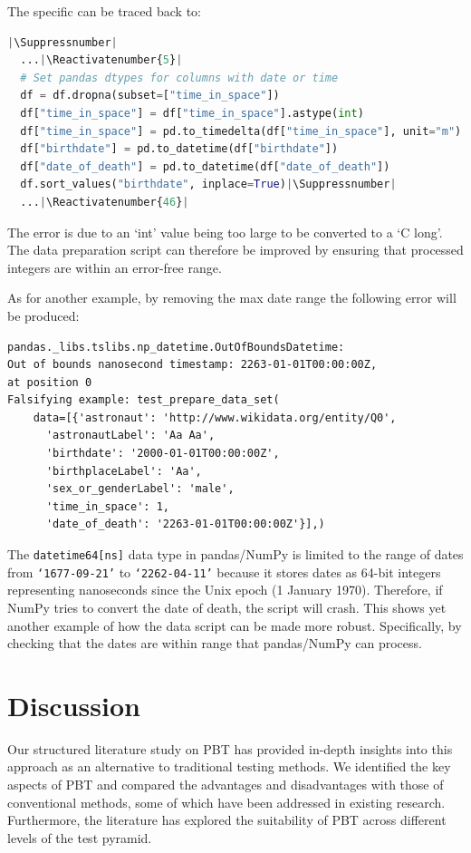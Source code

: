 \documentclass[runningheads]{llncs}
\makeatletter
\let\origthelstnumber\thelstnumber
\newcommand*\Suppressnumber{%
  \lst@AddToHook{OnNewLine}{%
    \let\thelstnumber\relax%
     \advance\c@lstnumber-\@ne\relax%
    }%
}
\newcommand*\Reactivatenumber[1]{%
  \setcounter{lstnumber}{\numexpr#1-1\relax}
  \lst@AddToHook{OnNewLine}{%
   \let\thelstnumber\origthelstnumber%
   \refstepcounter{lstnumber}%
  }%
}
\makeatother
\begin{document}
\noindent The specific can be traced back to:

\begin{lstlisting}[language=Python,caption={Prepare Data Set from code/data\_analysis.ipynb}]
  |\Suppressnumber|
  ...|\Reactivatenumber{5}|
  # Set pandas dtypes for columns with date or time
  df = df.dropna(subset=["time_in_space"])
  df["time_in_space"] = df["time_in_space"].astype(int)
  df["time_in_space"] = pd.to_timedelta(df["time_in_space"], unit="m")
  df["birthdate"] = pd.to_datetime(df["birthdate"])
  df["date_of_death"] = pd.to_datetime(df["date_of_death"])
  df.sort_values("birthdate", inplace=True)|\Suppressnumber|
  ...|\Reactivatenumber{46}|

\end{lstlisting}
The error is due to an `int' value being too large to be converted to a `C long'. The data preparation script can therefore be improved by ensuring that processed integers are within an error-free range.

\vspace{5mm}
\noindent As for another example, by removing the max date range the following error will be produced:

\begin{verbatim}
pandas._libs.tslibs.np_datetime.OutOfBoundsDatetime: 
Out of bounds nanosecond timestamp: 2263-01-01T00:00:00Z, 
at position 0
Falsifying example: test_prepare_data_set(
    data=[{'astronaut': 'http://www.wikidata.org/entity/Q0',
      'astronautLabel': 'Aa Aa',
      'birthdate': '2000-01-01T00:00:00Z',
      'birthplaceLabel': 'Aa',
      'sex_or_genderLabel': 'male',
      'time_in_space': 1,
      'date_of_death': '2263-01-01T00:00:00Z'}],) 
\end{verbatim}

\vspace{5mm}
\noindent The \texttt{datetime64[ns]} data type in pandas/NumPy is limited to the range of dates from \texttt{`1677-09-21'} to \texttt{`2262-04-11'} because it stores dates as 64-bit integers representing nanoseconds since the Unix epoch (1 January 1970). Therefore, if NumPy tries to convert the date of death, the script will crash. This shows yet another example of how the data script can be made more robust. Specifically, by checking that the dates are within range that pandas/NumPy can process.

\section{Discussion}
Our structured literature study on PBT has provided in-depth insights into this approach as an alternative to traditional testing methods. We identified the key aspects of PBT and compared the advantages and disadvantages with those of conventional methods, some of which have been addressed in existing research. Furthermore, the literature has explored the suitability of PBT across different levels of the test pyramid.
\end{document}
